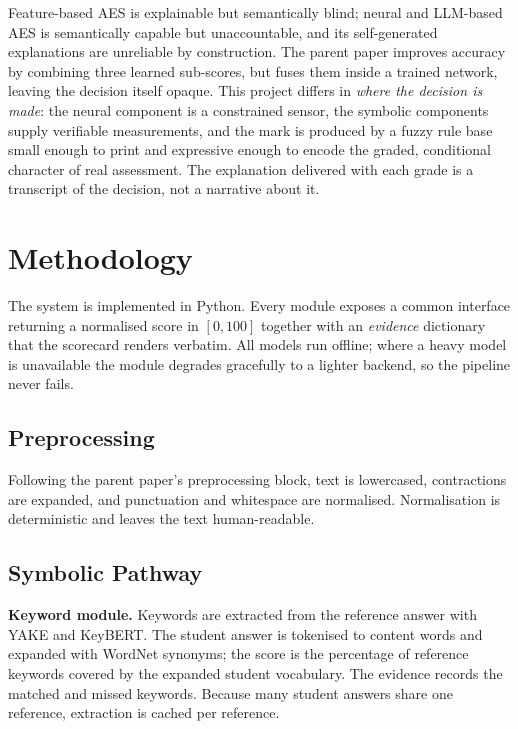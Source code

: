 \documentclass[11pt,a4paper]{article}
\begin{document}
Feature-based AES is explainable but semantically blind; neural and LLM-based AES
is semantically capable but unaccountable, and its self-generated explanations are
unreliable by construction. The parent paper \cite{agrawal2024} improves accuracy
by combining three learned sub-scores, but fuses them inside a trained network,
leaving the decision itself opaque. This project differs in \emph{where the
decision is made}: the neural component is a constrained sensor, the symbolic
components supply verifiable measurements, and the mark is produced by a fuzzy
rule base small enough to print and expressive enough to encode the graded,
conditional character of real assessment. The explanation delivered with each
grade is a transcript of the decision, not a narrative about it.

\newpage

\section{Methodology}

The system is implemented in Python. Every module exposes a common interface
returning a normalised score in $[0,100]$ together with an \emph{evidence}
dictionary that the scorecard renders verbatim. All models run offline; where a
heavy model is unavailable the module degrades gracefully to a lighter backend, so
the pipeline never fails.

\subsection{Preprocessing}

Following the parent paper's preprocessing block, text is lowercased, contractions
are expanded, and punctuation and whitespace are normalised. Normalisation is
deterministic and leaves the text human-readable.

\subsection{Symbolic Pathway}

\textbf{Keyword module.} Keywords are extracted from the reference answer with
YAKE and KeyBERT. The student answer is tokenised to content words and expanded
with WordNet synonyms; the score is the percentage of reference keywords covered
by the expanded student vocabulary. The evidence records the matched and missed
keywords. Because many student answers share one reference, extraction is cached
per reference.
\end{document}
